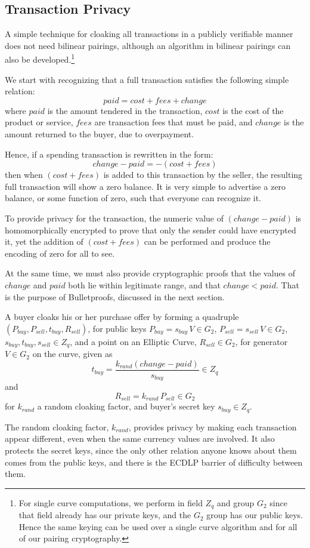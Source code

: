 \documentclass{yellowpaper}
\begin{document}
\subsection{Transaction Privacy}
A simple technique for cloaking all transactions in a publicly verifiable manner does not need bilinear pairings, although an algorithm in bilinear pairings can also be developed.\footnote{For single curve computations, we perform in field $Z_q$ and group $G_2$ since that field already has our private keys, and the $G_2$ group has our public keys. Hence the same keying can be used over a single curve algorithm and for all of our pairing cryptography.}

We start with recognizing that a full transaction satisfies the following simple relation:
$$paid = cost + fees + change$$
where $paid$ is the amount tendered in the transaction, $cost$ is the cost of the product or service, $fees$ are transaction fees that must be paid, and $change$ is the amount returned to the buyer, due to overpayment.

Hence, if a spending transaction is rewritten in the form:
$$change - paid = -(cost + fees)$$
then when $(cost + fees)$ is added to this transaction by the seller, the resulting full transaction will show a zero balance. It is very simple to advertise a zero balance, or some function of zero, such that everyone can recognize it.

To provide privacy for the transaction, the numeric value of $(change - paid)$ is homomorphically encrypted to prove that only the sender could have encrypted it, yet the addition of $(cost + fees)$ can be performed and produce the encoding of zero for all to see. 

At the same time, we must also provide cryptographic proofs that the values of $change$ and $paid$ both lie within legitimate range, and that $change < paid$. That is the purpose of Bulletproofs, discussed in the next section.

A buyer cloaks his or her purchase offer by forming a quadruple $(P_{buy}, P_{sell}, t_{buy}, R_{sell})$, for public keys $P_{buy} = s_{buy} \, V \in G_2$, $P_{sell} = s_{sell} \, V \in G_2$, $s_{buy}, t_{buy}, s_{sell} \in Z_q$, and a point on an Elliptic Curve, $R_{sell} \in G_2$, for generator $V \in G_2$ on the curve, given as
$$t_{buy} = \frac{k_{rand} (change - paid)}{s_{buy}} \in Z_q$$
and
$$R_{sell} = k_{rand}\, P_{sell} \in G_2$$
for $k_{rand}$ a random cloaking factor, and buyer's secret key $s_{buy} \in Z_q$.

The random cloaking factor, $k_{rand}$, provides privacy by making each transaction appear different, even when the same currency values are involved. It also protects the secret keys, since the only other relation anyone knows about them comes from the public keys, and there is the ECDLP barrier of difficulty between them.
\end{document}
